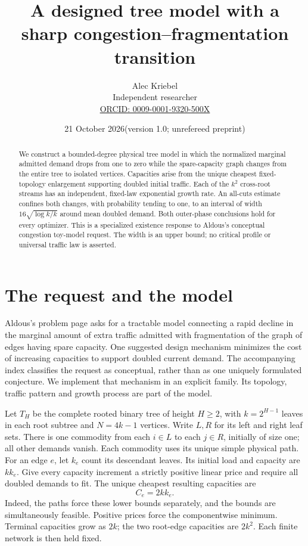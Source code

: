 \documentclass[10pt]{article}
\title{A designed tree model with a sharp congestion--fragmentation transition}
\author{Alec Kriebel\\\small Independent researcher\\
\small\href{https://orcid.org/0009-0001-9320-500X}{ORCID: 0009-0001-9320-500X}}
\date{21 October 2026\quad (version 1.0; unrefereed preprint)}
\begin{document}
\maketitle
\begin{abstract}
We construct a bounded-degree physical tree model in which the normalized
marginal admitted demand drops from one to zero while the spare-capacity graph
changes from the entire tree to isolated vertices. Capacities arise from the
unique cheapest fixed-topology enlargement supporting doubled initial traffic.
Each of the \(k^2\) cross-root streams has an independent, fixed-law exponential
growth rate. An all-cuts estimate confines both changes, with probability
tending to one, to an interval of width \(16\sqrt{\log k/k}\) around mean
doubled demand. Both outer-phase conclusions hold for every optimizer.
This is a specialized existence response to Aldous's conceptual congestion
toy-model request. The width is an upper bound; no critical profile or universal
traffic law is asserted.
\end{abstract}

\section{The request and the model}
Aldous's problem page \cite{A} asks for a tractable model connecting a rapid
decline in the marginal amount of extra traffic admitted with fragmentation
of the graph of edges having spare capacity. One suggested design mechanism
minimizes the cost of increasing capacities to support doubled current demand.
The accompanying index classifies the request as conceptual, rather than as
one uniquely formulated conjecture. We implement that mechanism in an explicit
family. Its topology, traffic pattern and growth process are part of the model.

Let \(T_H\) be the complete rooted binary tree of height \(H\ge2\), with
\(k=2^{H-1}\) leaves in each root subtree and \(N=4k-1\) vertices.
Write \(L,R\) for its left and right leaf sets. There is one commodity
from each \(i\in L\) to each \(j\in R\), initially of size one; all other
demands vanish. Each commodity uses its unique simple physical path.
For an edge \(e\), let \(k_e\) count its descendant leaves.
Its initial load and capacity are \(kk_e\). Give every capacity increment
a strictly positive linear price and require all doubled demands to fit.
The unique cheapest resulting capacities are
\begin{equation}\label{capacity}
 C_e=2kk_e.
\end{equation}
Indeed, the paths force these lower bounds separately, and the bounds are
simultaneously feasible. Positive prices force the componentwise minimum.
Terminal capacities grow as \(2k\); the two root-edge capacities are
\(2k^2\). Each finite network is then held fixed.
\end{document}
